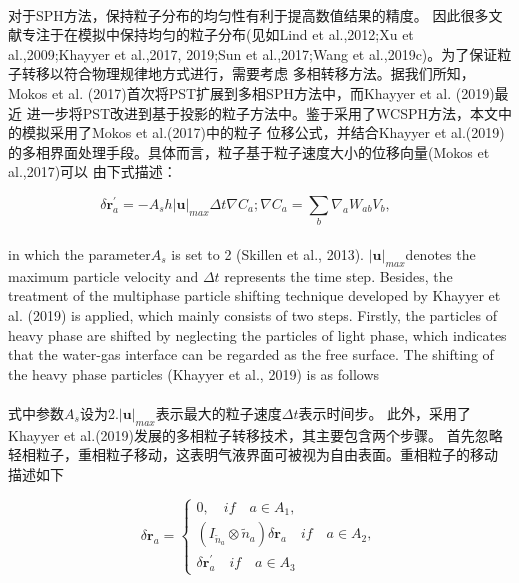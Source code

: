 \documentclass[UTF8]{ctexart}
\begin{document}
\paragraph{\quad}对于SPH方法，保持粒子分布的均匀性有利于提高数值结果的精度。
                因此很多文献专注于在模拟中保持均匀的粒子分布(见如Lind et al.,2012;Xu et al.,2009;Khayyer et al.,2017,
                2019;Sun et al.,2017;Wang et al.,2019c)。为了保证粒子转移以符合物理规律地方式进行，需要考虑
                多相转移方法。据我们所知，Mokos et al. (2017)首次将PST扩展到多相SPH方法中，而Khayyer et al. (2019)最近
                进一步将PST改进到基于投影的粒子方法中。鉴于采用了WCSPH方法，本文中的模拟采用了Mokos et al.(2017)中的粒子
                位移公式，并结合Khayyer et al.(2019)的多相界面处理手段。具体而言，粒子基于粒子速度大小的位移向量(Mokos et al.,2017)可以
                由下式描述：

\begin{equation}
   \delta \mathbf{r}^{'}_a = -A_s h |\mathbf{u}|_{max} \Delta t \nabla C_a;\nabla C_a = \sum_{b}\nabla_a W_{ab} V_b , \qquad 
   \end{equation}

\paragraph{\quad}in which the parameter$ A_s$ is set to 2 (Skillen et al., 2013). 
                $|\mathbf{u}|_{max} $denotes the maximum particle velocity and $\Delta t$ represents 
                the time step. Besides, the treatment of the multiphase particle 
                shifting technique developed by Khayyer et al. (2019) is applied, 
                which mainly consists of two steps. Firstly, the particles of 
                heavy phase are shifted by neglecting the particles of light phase, 
                which indicates that the water-gas interface can be regarded as the 
                free surface. The shifting of the heavy phase particles (Khayyer et al., 2019) 
                is as follows
\paragraph{\quad}式中参数$A_s$设为2.$|\mathbf{u}|_{max}$表示最大的粒子速度$\Delta t$表示时间步。
                此外，采用了Khayyer et al.(2019)发展的多相粒子转移技术，其主要包含两个步骤。
                首先忽略轻相粒子，重相粒子移动，这表明气液界面可被视为自由表面。重相粒子的移动
                描述如下

\begin{equation}
   \delta \mathbf{r}_a = \begin{cases} 0, \quad if \quad a \in A_1, \\
   (I_\tilde{n}_a\otimes\tilde{n}_a)\delta \mathbf{r}_a \quad if \quad a \in A_2, \\
   \delta \mathbf{r}_a^{'} \quad if \quad a \in A_3 \end{cases} 
\end{equation}
\end{document}

